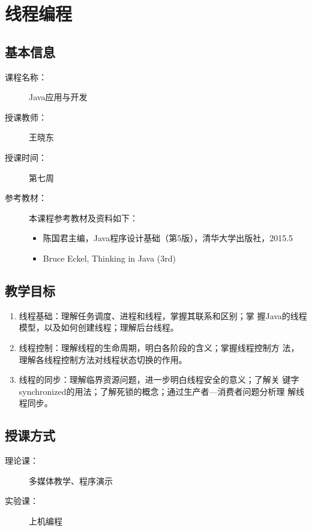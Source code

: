\chapter*{线程编程}
\label{chp:Java-thread-programming}

\section*{基本信息}
\sline
\begin{description}
\item[课程名称：] Java应用与开发
\item[授课教师：] 王晓东
\item[授课时间：] 第七周
\item[参考教材：] 本课程参考教材及资料如下：
  \begin{itemize}
  \item 陈国君主编，Java程序设计基础（第5版），清华大学出版社，2015.5
  \item Bruce Eckel, Thinking in Java (3rd)
  \end{itemize}
\end{description}

\section*{教学目标}

\sline

\begin{enumerate}
\item 线程基础：理解任务调度、进程和线程，掌握其联系和区别；掌
  握Java的线程模型，以及如何创建线程；理解后台线程。
\item 线程控制：理解线程的生命周期，明白各阶段的含义；掌握线程控制方
  法，理解各线程控制方法对线程状态切换的作用。
\item 线程的同步：理解临界资源问题，进一步明白线程安全的意义；了解关
  键字synchronized的用法；了解死锁的概念；通过生产者—消费者问题分析理
  解线程同步。
\end{enumerate}

\section*{授课方式}

\sline
\begin{description}
\item[理论课：] 多媒体教学、程序演示
\item[实验课：] 上机编程
\end{description}

